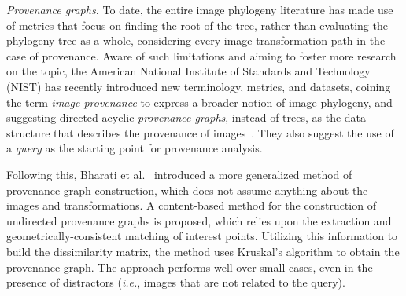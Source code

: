 \textit{Provenance graphs.}
To date, the entire image phylogeny literature has made use of metrics that focus on finding the root of the tree, rather than evaluating the phylogeny tree as a whole, considering every image transformation path in the case of provenance.
Aware of such limitations and aiming to foster more research on the topic, the American National Institute of Standards and Technology (NIST) has recently introduced new terminology, metrics, and datasets, coining the term \emph{image provenance} to express a broader notion of image phylogeny, and suggesting directed acyclic \emph{provenance graphs}, instead of trees, as the data structure that describes the provenance of images~\cite{nist2017plan}.
They also suggest the use of a \emph{query} as the starting point for provenance analysis.

Following this, Bharati et al.~\cite{bharati2017uphy} introduced a more generalized method of provenance graph construction, which does not assume anything about the images and transformations.
A content-based method for the construction of undirected provenance graphs is proposed, which relies upon the extraction and geometrically-consistent matching of interest points.
Utilizing this information to build the dissimilarity matrix, the method uses Kruskal's %
algorithm to obtain the provenance graph.
The approach performs well over small cases, even in the presence of distractors (\textit{i.e.}, images that are not related to the query). %



